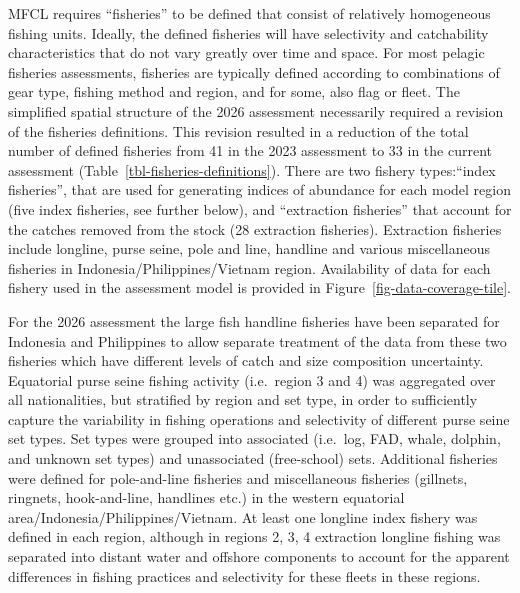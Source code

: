 \documentclass[
  english,
  a4paper,
  a4paper,
  11pt]{SCreport}
\begin{document}
MFCL requires ``fisheries'' to be defined that consist of relatively
homogeneous fishing units. Ideally, the defined fisheries will have
selectivity and catchability characteristics that do not vary greatly
over time and space. For most pelagic fisheries assessments, fisheries
are typically defined according to combinations of gear type, fishing
method and region, and for some, also flag or fleet. The simplified
spatial structure of the 2026 assessment necessarily required a revision
of the fisheries definitions. This revision resulted in a reduction of
the total number of defined fisheries from 41 in the 2023 assessment to
33 in the current assessment (Table~\ref{tbl-fisheries-definitions}).
There are two fishery types:``index fisheries'', that are used for
generating indices of abundance for each model region (five index
fisheries, see further below), and ``extraction fisheries'' that account
for the catches removed from the stock (28 extraction fisheries).
Extraction fisheries include longline, purse seine, pole and line,
handline and various miscellaneous fisheries in
Indonesia/Philippines/Vietnam region. Availability of data for each
fishery used in the assessment model is provided in
Figure~\ref{fig-data-coverage-tile}.

For the 2026 assessment the large fish handline fisheries have been
separated for Indonesia and Philippines to allow separate treatment of
the data from these two fisheries which have different levels of catch
and size composition uncertainty. Equatorial purse seine fishing
activity (i.e.~region 3 and 4) was aggregated over all nationalities,
but stratified by region and set type, in order to sufficiently capture
the variability in fishing operations and selectivity of different purse
seine set types. Set types were grouped into associated (i.e.~log, FAD,
whale, dolphin, and unknown set types) and unassociated (free-school)
sets. Additional fisheries were defined for pole-and-line fisheries and
miscellaneous fisheries (gillnets, ringnets, hook-and-line, handlines
etc.) in the western equatorial area/Indonesia/Philippines/Vietnam. At
least one longline index fishery was defined in each region, although in
regions 2, 3, 4 extraction longline fishing was separated into distant
water and offshore components to account for the apparent differences in
fishing practices and selectivity for these fleets in these regions.
\end{document}
